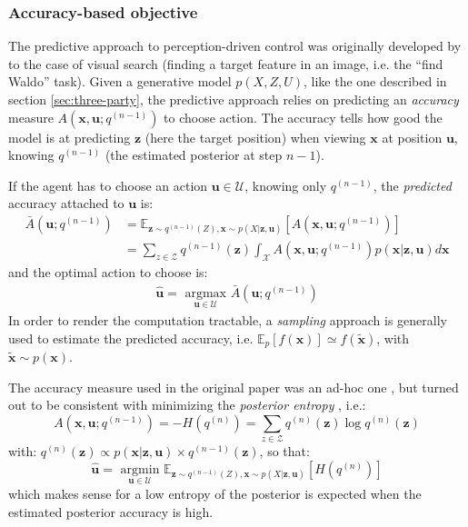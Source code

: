 \documentclass[12pt,twoside,openright]{article}
\begin{document}
\subsubsection{Accuracy-based objective}\label{sec:infomax}

The predictive approach to perception-driven control was originally developed by \citep{najemnik2005optimal} to the case of visual search (finding a target feature in an image, i.e. the ``find Waldo'' task).
Given a generative model $p(X,Z,U)$, like the one described in section \ref{sec:three-party}, the predictive approach relies on predicting an \emph{accuracy} measure $A(\boldsymbol{x}, \boldsymbol{u}; q^{(n-1)})$ to choose action. 
The accuracy tells how good the model is at predicting $\boldsymbol{z}$ (here the target position) when viewing $\boldsymbol{x}$ at position $\boldsymbol{u}$,
knowing $q^{(n-1)}$ (the estimated posterior at step $n-1$).

If the agent has to choose an action $\boldsymbol{u} \in \mathcal{U}$, knowing only $q^{(n-1)}$, the \emph{predicted} accuracy attached to $\boldsymbol{u}$ is:
\begin{align*}
\bar{A}(\boldsymbol{u}; q^{(n-1)})
&= \mathbb{E}_{\boldsymbol{z} \sim q^{(n-1)}(Z), \boldsymbol{x} \sim p(X|\boldsymbol{z}, \boldsymbol{u})}\left[A(\boldsymbol{x}, \boldsymbol{u}; q^{(n-1)})\right]  \\
&= \sum_{z\in\mathcal{Z}} q^{(n-1)}(\boldsymbol{z}) \int_{\mathcal{X}}  A(\boldsymbol{x}, \boldsymbol{u}; q^{(n-1)}) p(\boldsymbol{x}|\boldsymbol{z}, \boldsymbol{u}) d\boldsymbol{x}  
\end{align*}
and the optimal action to choose is:
\begin{align}
\hat{\boldsymbol{u}} = \underset{\boldsymbol{u} \in \mathcal{U}}{\text{ argmax }} \bar{A}(\boldsymbol{u}; q^{(n-1)})\label{eq:predictive-policy}
\end{align} 
In order to render the computation tractable, a \emph{sampling} approach is generally used to estimate the predicted accuracy, i.e. $\mathbb{E}_p[f(\boldsymbol{x})] \simeq f(\tilde{\boldsymbol{x}})$, with $\tilde{\boldsymbol{x}}\sim p(\boldsymbol{x})$.

The accuracy measure used in the original paper was an ad-hoc one \citep{najemnik2005optimal}, but turned out to be consistent with minimizing the \emph{posterior entropy} \citep{najemnik2009simple}, i.e.:
$$A(\boldsymbol{x}, \boldsymbol{u}; q^{(n-1)}) = -H(q^{(n)}) = \sum_{z \in \mathcal{Z}} q^{(n)}(\boldsymbol{z}) \log q^{(n)}(\boldsymbol{z})$$
with: $q^{(n)}(\boldsymbol{z}) \propto p(\boldsymbol{x|\boldsymbol{z}, \boldsymbol{u}}) \times q^{(n-1)}(\boldsymbol{z}) $,
so that:
$$\hat{\boldsymbol{u}} = \underset{\boldsymbol{u} \in \mathcal{U}}{\text{ argmin }} \mathbb{E}_{\boldsymbol{z} \sim q^{(n-1)}(Z), \boldsymbol{x} \sim p(X|\boldsymbol{z}, \boldsymbol{u})}\left[H(q^{(n)})\right] $$ 
which makes sense for a low entropy of the posterior is expected when the estimated posterior accuracy is high.
\end{document}

